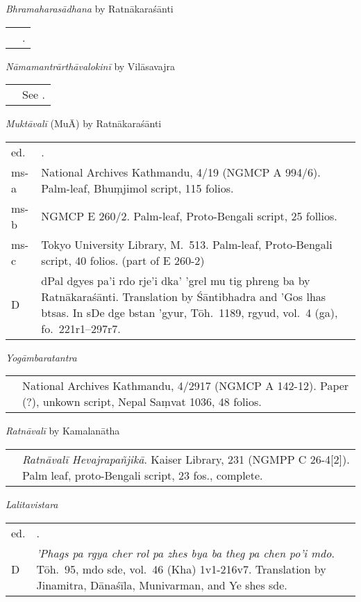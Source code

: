 \documentclass[12pt,twoside]{article}
\newcommand{\mybibexclude}[1]{\addtocategory{fullcited}{#1}}
\begin{document}
\noindent\emph{Bhramaharasādhana} by Ratnākaraśānti
\noindent\begin{longtable}{ p{} p{} }
	& \fullcite*{isaacson2002}.\mybibexclude{isaacson2002} 
\end{longtable}

\noindent\emph{Nāmamantrārthāvalokinī} by Vilāsavajra
\noindent\begin{longtable}{ p{} p{} }
	& See \textcite{tribe2016}.
\end{longtable}

\noindent\emph{Muktāvalī} (MuĀ) by Ratnākaraśānti
\noindent\begin{longtable}{ p{} p{} }
	ed. & \fullcite*{tripathi2001}.\mybibexclude{tripathi2001} \\
	ms-a & National Archives Kathmandu, 4/19 (NGMCP A 994/6). Palm-leaf, Bhuṃjimol script, 115 folios.\\
	ms-b & NGMCP E 260/2. Palm-leaf, Proto-Bengali script, 25 follios. \\
	ms-c & Tokyo University Library, M.\ 513. Palm-leaf, Proto-Bengali script, 40 folios. (part of E 260-2) \\
	D & dPal dgyes pa'i rdo rje'i dka' 'grel mu tig phreng ba by Ratnākaraśānti. Translation by Śāntibhadra and 'Gos lhas btsas. In sDe dge bstan 'gyur, Tōh.\ 1189, rgyud, vol.\ 4 (ga), fo.\ 221r1–297r7. 
\end{longtable}

\noindent\emph{Yogāmbaratantra}
\noindent\begin{longtable}{ p{} p{} }
	& National Archives Kathmandu, 4/2917 (NGMCP A 142-12). Paper (?), unkown script, Nepal Saṃvat 1036, 48 folios.
\end{longtable}

\noindent\emph{Ratnāvalī} by Kamalanātha 
\noindent\begin{longtable}{ p{} p{} }
	& \emph{Ratnāvalī Hevajrapañjikā}. Kaiser Library, 231 (NGMPP C 26-4[2]). Palm leaf, proto-Bengali script, 23 fos., complete. 
\end{longtable}

\noindent\emph{Lalitavistara}
\noindent\begin{longtable}{ p{} p{} }
	ed. & \fullcite*{lefmann1902}.\mybibexclude{lefmann1902} \\ 
	D & \emph{'Phags pa rgya cher rol pa zhes bya ba theg pa chen po'i mdo}. Tōh.\ 95, mdo sde, vol.\ 46 (Kha) 1v1-216v7. Translation by Jinamitra, Dānaśīla, Munivarman, and Ye shes sde.
\end{longtable}
\end{document}
